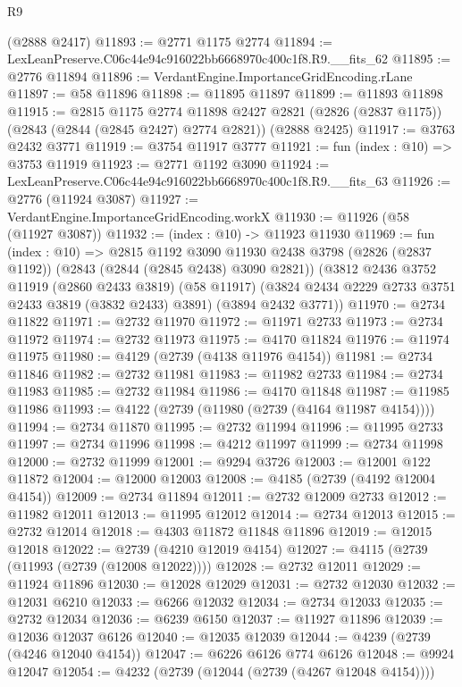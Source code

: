 \begin{lexlean}{R9}
\begin{coremodule}
    (@2888 @2417)
@11893 := @2771 @1175 @2774
@11894 := LexLeanPreserve.C06c44e94c916022bb6668970c400c1f8.R9.__fits_62
@11895 := @2776 @11894
@11896 := VerdantEngine.ImportanceGridEncoding.rLane
@11897 := @58 @11896
@11898 := @11895 @11897
@11899 := @11893 @11898
@11915 := @2815
    @1175
    @2774
    @11898
    @2427
    @2821
    (@2826 (@2837 @1175))
    (@2843 (@2844 (@2845 @2427) @2774 @2821))
    (@2888 @2425)
@11917 := @3763 @2432 @3771
@11919 := @3754 @11917 @3777
@11921 := fun (index : @10) => @3753 @11919
@11923 := @2771 @1192 @3090
@11924 := LexLeanPreserve.C06c44e94c916022bb6668970c400c1f8.R9.__fits_63
@11926 := @2776 (@11924 @3087)
@11927 := VerdantEngine.ImportanceGridEncoding.workX
@11930 := @11926 (@58 (@11927 @3087))
@11932 := (index : @10) -> @11923 @11930
@11969 := fun (index : @10) =>
  @2815
    @1192
    @3090
    @11930
    @2438
    @3798
    (@2826 (@2837 @1192))
    (@2843 (@2844 (@2845 @2438) @3090 @2821))
    (@3812
      @2436
      @3752
      @11919
      (@2860 @2433 @3819)
      (@58 @11917)
      (@3824 @2434 @2229 @2733 @3751 @2433 @3819 (@3832 @2433) @3891)
      (@3894 @2432 @3771))
@11970 := @2734 @11822
@11971 := @2732 @11970
@11972 := @11971 @2733
@11973 := @2734 @11972
@11974 := @2732 @11973
@11975 := @4170 @11824
@11976 := @11974 @11975
@11980 := @4129 (@2739 (@4138 @11976 @4154))
@11981 := @2734 @11846
@11982 := @2732 @11981
@11983 := @11982 @2733
@11984 := @2734 @11983
@11985 := @2732 @11984
@11986 := @4170 @11848
@11987 := @11985 @11986
@11993 := @4122 (@2739 (@11980 (@2739 (@4164 @11987 @4154))))
@11994 := @2734 @11870
@11995 := @2732 @11994
@11996 := @11995 @2733
@11997 := @2734 @11996
@11998 := @4212 @11997
@11999 := @2734 @11998
@12000 := @2732 @11999
@12001 := @9294 @3726
@12003 := @12001 @122 @11872
@12004 := @12000 @12003
@12008 := @4185 (@2739 (@4192 @12004 @4154))
@12009 := @2734 @11894
@12011 := @2732 @12009 @2733
@12012 := @11982 @12011
@12013 := @11995 @12012
@12014 := @2734 @12013
@12015 := @2732 @12014
@12018 := @4303 @11872 @11848 @11896
@12019 := @12015 @12018
@12022 := @2739 (@4210 @12019 @4154)
@12027 := @4115 (@2739 (@11993 (@2739 (@12008 @12022))))
@12028 := @2732 @12011
@12029 := @11924 @11896
@12030 := @12028 @12029
@12031 := @2732 @12030
@12032 := @12031 @6210
@12033 := @6266 @12032
@12034 := @2734 @12033
@12035 := @2732 @12034
@12036 := @6239 @6150
@12037 := @11927 @11896
@12039 := @12036 @12037 @6126
@12040 := @12035 @12039
@12044 := @4239 (@2739 (@4246 @12040 @4154))
@12047 := @6226 @6126 @774 @6126
@12048 := @9924 @12047
@12054 := @4232 (@2739 (@12044 (@2739 (@4267 @12048 @4154))))

\end{coremodule}
\end{lexlean}
